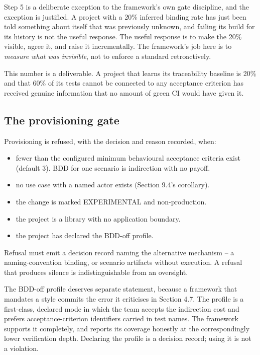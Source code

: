 \documentclass[11pt,a4paper]{article}
\begin{document}
Step 5 is a deliberate exception to the framework's own gate discipline, and the exception is justified. A project with a 20\% inferred binding rate has just been told something about itself that was previously unknown, and failing its build for its history is not the useful response. The useful response is to make the 20\% visible, agree it, and raise it incrementally. The framework's job here is to \emph{measure what was invisible}, not to enforce a standard retroactively.

This number is a deliverable. A project that learns its traceability baseline is 20\% and that 60\% of its tests cannot be connected to any acceptance criterion has received genuine information that no amount of green CI would have given it.

\subsection{The provisioning gate}

Provisioning is refused, with the decision and reason recorded, when:

\begin{itemize}[leftmargin=*,nosep,topsep=2pt]
\item fewer than the configured minimum behavioural acceptance criteria exist   (default 3). BDD for one scenario is indirection with no payoff.
\item no use case with a named actor exists (Section 9.4's corollary).
\item the change is marked EXPERIMENTAL and non-production.
\item the project is a library with no application boundary.
\item the project has declared the BDD-off profile.
\end{itemize}

Refusal must emit a decision record naming the alternative mechanism -- a naming-convention binding, or scenario artifacts without execution. A refusal that produces silence is indistinguishable from an oversight.

The BDD-off profile deserves separate statement, because a framework that mandates a style commits the error it criticises in Section 4.7. The profile is a first-class, declared mode in which the team accepts the indirection cost and prefers acceptance-criterion identifiers carried in test names. The framework supports it completely, and reports its coverage honestly at the correspondingly lower verification depth. Declaring the profile is a decision record; using it is not a violation.
\end{document}
